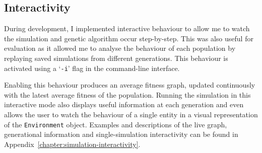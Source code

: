 \documentclass[12pt,a4paper]{report}
\begin{document}
\subsection{Interactivity}\label{section:interactivity}

During development, I implemented interactive behaviour to allow me to watch the simulation and genetic algorithm occur step-by-step. This was also useful for evaluation as it allowed me to analyse the behaviour of each population by replaying saved simulations from different generations. This behaviour is activated using a `\texttt{-i}' flag in the command-line interface.

Enabling this behaviour produces an average fitness graph, updated continuously with the latest average fitness of the population. Running the simulation in this interactive mode also displays useful information at each generation and even allows the user to watch the behaviour of a single entity in a visual representation of the \texttt{Environment} object. Examples and descriptions of the live graph, generational information and single-simulation interactivity can be found in Appendix~\ref{chapter:simulation-interactivity}.



\end{document}

